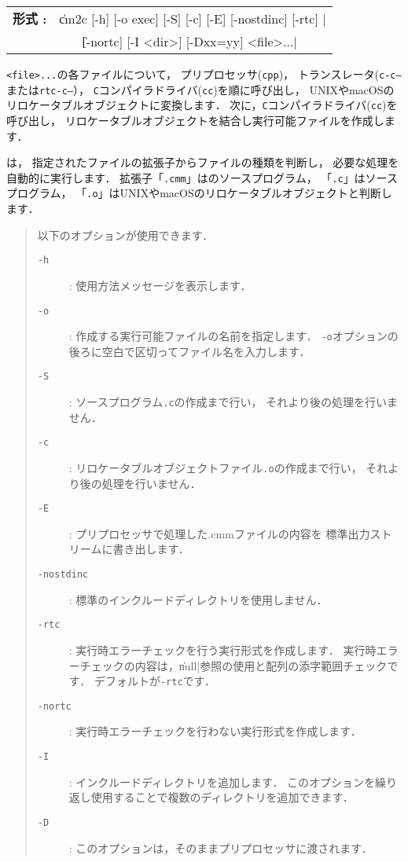 \begin{flushleft}
\begin{tabular}{l l}
{\bf 形式 : } & \|cm2c [-h] [-o exec] [-S] [-c] [-E] [-nostdinc] [-rtc] | \\
              & ~~~ \| [-nortc] [-I <dir>] [-Dxx=yy] <file>...|
\end{tabular}
\end{flushleft}

{\tt <file>...}の各ファイルについて，
プリプロセッサ({\tt cpp})，
トランスレータ({\tt c-c--}または{\tt rtc-c--}），
{\tt C}コンパイラドライバ({\tt cc})を順に呼び出し，
UNIXやmacOSのリロケータブルオブジェクトに変換します．
次に，{\tt C}コンパイラドライバ({\tt cc})を呼び出し，
リロケータブルオブジェクトを結合し実行可能ファイルを作成します．

{\cmc}は，
指定されたファイルの拡張子からファイルの種類を判断し，
必要な処理を自動的に実行します．
拡張子「{\tt .cmm}」は{\cmml}のソースプログラム，
「{\tt .c}」は{\cl}ソースプログラム，
「{\tt .o}」はUNIXやmacOSのリロケータブルオブジェクトと判断します．

\begin{quote}
\hspace{-1em}以下のオプションが使用できます．

\begin{description}
\item[{\tt -h}] : 使用方法メッセージを表示します．
\item[{\tt -o}] : 作成する実行可能ファイルの名前を指定します．
{\tt -o}オプションの後ろに空白で区切ってファイル名を入力します．
\item[{\tt -S}] : {\cl}ソースプログラム{\tt .c}の作成まで行い，
  それより後の処理を行いません．
\item[{\tt -c}] : リロケータブルオブジェクトファイル{\tt .o}の作成まで行い，
  それより後の処理を行いません．
\item[{\tt -E}] : プリプロセッサで処理した{.cmm}ファイルの内容を
  標準出力ストリームに書き出します．
\item[{\tt -nostdinc}] : 標準のインクルードディレクトリを使用しません．
\item[{\tt -rtc}] : 実行時エラーチェックを行う実行形式を作成します．
  実行時エラーチェックの内容は，\|null|参照の使用と配列の添字範囲チェックです．
  デフォルトが{\tt -rtc}です．
\item[{\tt -nortc}] : 実行時エラーチェックを行わない実行形式を作成します．
\item[{\tt -I}] : インクルードディレクトリを追加します．
  このオプションを繰り返し使用することで複数のディレクトリを追加できます．
\item[{\tt -D}] : このオプションは，そのままプリプロセッサに渡されます．
\end{description}
\end{quote}

